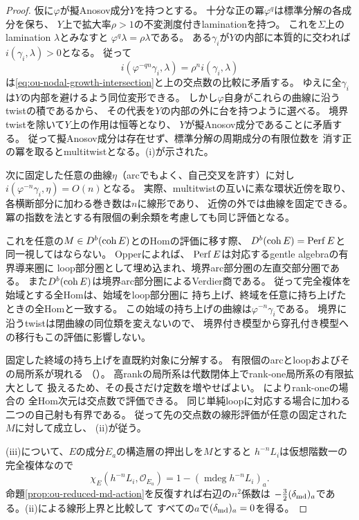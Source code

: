 \begin{proof}
仮に$\varphi$が擬Anosov成分$Y$を持つとする。
十分な正の冪$\varphi^q$は標準分解の各成分を保ち、
$Y$上で拡大率$\rho>1$の不変測度付きlaminationを持つ。
これを$\Sigma$上のlamination $\lambda$とみなすと
$\varphi^q\lambda=\rho\lambda$である。
ある$\gamma_i$が$Y$の内部に本質的に交われば
$i(\gamma_i,\lambda)>0$となる。
従って
\[
 i(\varphi^{-qn}\gamma_i,\lambda)
 =\rho^n i(\gamma_i,\lambda)
\]
は\eqref{eq:ou-nodal-growth-intersection}と上の交点数の比較に矛盾する。
ゆえに全$\gamma_i$は$Y$の内部を避けるよう同位変形できる。
しかし$\varphi$自身がこれらの曲線に沿うtwistの積であるから、
その代表を$Y$の内部の外に台を持つように選べる。
境界twistを除いて$Y$上の作用は恒等となり、
$Y$が擬Anosov成分であることに矛盾する。
従って擬Anosov成分は存在せず、標準分解の周期成分の有限位数を
消す正の冪を取るとmultitwistとなる。(i)が示された。

次に固定した任意の曲線$\eta$（arcでもよく、自己交叉を許す）に対し
$i(\varphi^{-n}\gamma_i,\eta)=O(n)$となる。
実際、multitwistの互いに素な環状近傍を取り、
各横断部分に加わる巻き数は$n$に線形であり、
近傍の外では曲線を固定できる。
冪の指数を法とする有限個の剰余類を考慮しても同じ評価となる。

これを任意の$M\in D^b(\operatorname{coh} E)$とのHomの評価に移す際、
$D^b(\operatorname{coh} E)=\operatorname{Perf} E$と同一視してはならない。
Opper\cite[Proposition~8.2, Lemma~8.4, Proposition~8.6,
Remark~8.7]{Opper2026}によれば、
$\operatorname{Perf} E$は対応するgentle algebraの有界導来圏に
loop部分圏として埋め込まれ、境界arc部分圏の左直交部分圏である。
また$D^b(\operatorname{coh} E)$は境界arc部分圏によるVerdier商である。
従って完全複体を始域とする全Homは、始域をloop部分圏に
持ち上げ、終域を任意に持ち上げたときの全Homと一致する。
この始域の持ち上げの曲線は$\varphi^{-n}\gamma_i$である。
境界に沿うtwistは閉曲線の同位類を変えないので、
境界付き模型から穿孔付き模型への移行もこの評価に影響しない。

固定した終域の持ち上げを直既約対象に分解する。
有限個のarcとloopおよびその局所系が現れる
（\cite[Section~4.3]{Opper2026}）。
高rankの局所系は代数閉体上でrank-one局所系の有限拡大として
扱えるため、その長さだけ定数を増やせばよい。
\cite[Proposition~4.10]{Opper2026}によりrank-oneの場合の
全Hom次元は交点数で評価できる。
同じ単純loopに対応する場合に加わる二つの自己射も有界である。
従って先の交点数の線形評価が任意の固定された$M$に対して成立し、
(ii)が従う。

(iii)について、$E$の成分$E_a$の構造層の押出しを$M$とすると
$h^{-n}L_i$は仮想階数一の完全複体なので
\[
 \chi_E(h^{-n}L_i,\mathcal O_{E_a})
 =1-(\operatorname{mdeg}h^{-n}L_i)_a.
\]
命題\ref{prop:ou-reduced-md-action}を反復すれば右辺の$n^2$係数は
$-\frac32(\delta_{\rm md})_a$である。(ii)による線形上界と比較して
すべての$a$で$(\delta_{\rm md})_a=0$を得る。


\end{proof}
